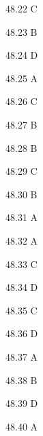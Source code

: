 \begin{Solution}{48.{22}}
C
\end{Solution}
\begin{Solution}{48.{23}}
B
\end{Solution}
\begin{Solution}{48.{24}}
D
\end{Solution}
\begin{Solution}{48.{25}}
A
\end{Solution}
\begin{Solution}{48.{26}}
C
\end{Solution}
\begin{Solution}{48.{27}}
B
\end{Solution}
\begin{Solution}{48.{28}}
B
\end{Solution}
\begin{Solution}{48.{29}}
C
\end{Solution}
\begin{Solution}{48.{30}}
B
\end{Solution}
\begin{Solution}{48.{31}}
A
\end{Solution}
\begin{Solution}{48.{32}}
A
\end{Solution}
\begin{Solution}{48.{33}}
C
\end{Solution}
\begin{Solution}{48.{34}}
D
\end{Solution}
\begin{Solution}{48.{35}}
C
\end{Solution}
\begin{Solution}{48.{36}}
D
\end{Solution}
\begin{Solution}{48.{37}}
A
\end{Solution}
\begin{Solution}{48.{38}}
B
\end{Solution}
\begin{Solution}{48.{39}}
D
\end{Solution}
\begin{Solution}{48.{40}}
A
\end{Solution}
